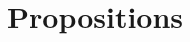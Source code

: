 \documentclass[nativefonts,print]{Style/class_dissertation}
\begin{document}
\section*{Propositions}
\thispagestyle{empty} %


\end{document}
